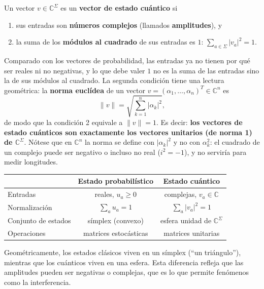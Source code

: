 \documentclass[11pt, a4paper, twoside, openright]{report}
\begin{document}
\begin{tcolorbox}[colback=teal!5!white,colframe=teal!75!black,title=\textbf{Definición: Vector de estado cuántico}]
Un vector $v \in \mathbb{C}^\Sigma$ es un \textbf{vector de estado cuántico} si
\begin{enumerate}
    \item sus entradas son \textbf{números complejos} (llamados \textbf{amplitudes}), y
    \item la suma de los \textbf{módulos al cuadrado} de sus entradas es $1$: $\displaystyle\sum_{a \in \Sigma} |v_a|^2 = 1$.
\end{enumerate}
\end{tcolorbox}

\noindent Comparado con los vectores de probabilidad, las entradas ya no tienen por qué ser reales ni no negativas, y lo que debe valer $1$ no es la suma de las entradas sino la de sus módulos al cuadrado. La segunda condición tiene una lectura geométrica: la \textbf{norma euclídea} de un vector $v = (\alpha_1, \dots, \alpha_n)^T \in \mathbb{C}^n$ es
\[ \|v\| = \sqrt{\sum_{k=1}^n |\alpha_k|^2}, \]
de modo que la condición 2 equivale a $\|v\| = 1$. Es decir: \textbf{los vectores de estado cuánticos son exactamente los vectores unitarios (de norma 1) de $\mathbb{C}^\Sigma$}. Nótese que en $\mathbb{C}^n$ la norma se define con $|\alpha_k|^2$ y no con $\alpha_k^2$: el cuadrado de un complejo puede ser negativo o incluso no real ($i^2 = -1$), y no serviría para medir longitudes.

\begin{tcolorbox}[colback=blue!5!white,colframe=blue!75!black,title=\textbf{Nota Aclaratoria: Comparación entre ambos tipos de estado}]
\begin{center}
\begin{tabular}{l|c|c}
 & \textbf{Estado probabilístico} & \textbf{Estado cuántico} \\ \hline
 Entradas & reales, $u_a \ge 0$ & complejas, $v_a \in \mathbb{C}$ \\
 Normalización & $\sum_a u_a = 1$ & $\sum_a |v_a|^2 = 1$ \\
 Conjunto de estados & símplex (convexo) & esfera unidad de $\mathbb{C}^\Sigma$ \\
 Operaciones & matrices estocásticas & matrices unitarias
\end{tabular}
\end{center}
Geométricamente, los estados clásicos viven en un símplex (``un triángulo''), mientras que los cuánticos viven en una esfera. Esta diferencia refleja que las amplitudes pueden ser negativas o complejas, que es lo que permite fenómenos como la interferencia.
\end{tcolorbox}
\end{document}
